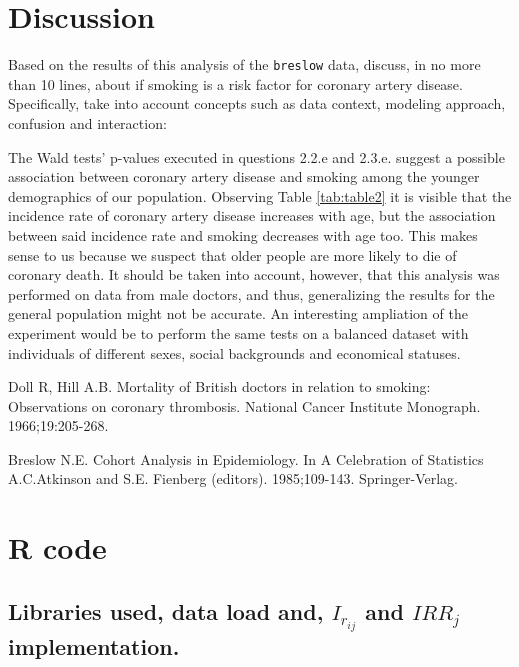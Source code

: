 \documentclass[10pt,a4paper,twoside]{article}\usepackage[]{graphicx}\usepackage[]{xcolor}
\newcommand{\Robject}[1]{\texttt{#1}}
\begin{document}
\section{Discussion}
\label{sec:discussion}
Based on the results of this analysis of the \Robject{breslow} data, discuss, in no more than 10 lines, about if smoking is a risk factor for coronary artery disease. Specifically, take into account concepts such as data context, modeling approach, confusion and interaction:

The Wald tests' p-values executed in questions 2.2.e and 2.3.e. suggest a possible association between coronary artery disease and smoking among the younger demographics of our population. Observing Table \ref{tab:table2} it is visible that the incidence rate of coronary artery disease increases with age, but the association between said incidence rate and smoking decreases with age too. This makes sense to us because we suspect that older people are more likely to die of coronary death. It should be taken into account, however, that this analysis was performed on data from male doctors, and thus, generalizing the results for the general population might not be accurate. An interesting ampliation of the experiment would be to perform the same tests on a balanced dataset with individuals of different sexes, social backgrounds and economical statuses.

\begin{thebibliography}{99}

Doll R, Hill A.B. Mortality of British doctors in relation to smoking: Observations on coronary thrombosis. National Cancer Institute Monograph. 1966;19:205-268.

Breslow N.E. Cohort Analysis in Epidemiology. In A Celebration of Statistics A.C.Atkinson and S.E. Fienberg (editors). 1985;109-143. Springer-Verlag.

\end{thebibliography}


\clearpage


\appendix
\section{R code}
\label{app:Rcode}

\subsection{Libraries used, data load and, $I_{r_{ij}}$ and $IRR_{j}$ implementation.}
\label{app:Ir and IRR}
\end{document}
